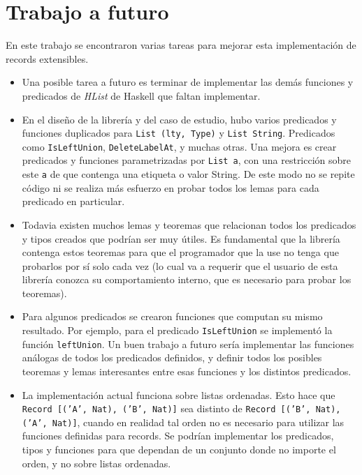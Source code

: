 
\chapter{Trabajo a futuro}
\label{ch:5}

En este trabajo se encontraron varias tareas para mejorar esta implementación de records extensibles.
\begin{itemize}
\item Una posible tarea a futuro es terminar de implementar las demás funciones y predicados de \textit{HList} de Haskell que faltan implementar.
\item En el diseño de la librería y del caso de estudio, hubo varios predicados y funciones duplicados para \texttt{List (lty, Type)} y \texttt{List String}. Predicados como \texttt{IsLeftUnion}, \texttt{DeleteLabelAt}, y muchas otras. Una mejora es crear predicados y funciones parametrizadas por \texttt{List a}, con una restricción sobre este \texttt{a} de que contenga una etiqueta o valor String. De este modo no se repite código ni se realiza más esfuerzo en probar todos los lemas para cada predicado en particular.
\item Todavia existen muchos lemas y teoremas que relacionan todos los predicados y tipos creados que podrían ser muy útiles. Es fundamental que la librería contenga estos teoremas para que el programador que la use no tenga que probarlos por sí solo cada vez (lo cual va a requerir que el usuario de esta librería conozca su comportamiento interno, que es necesario para probar los teoremas).
\item Para algunos predicados se crearon funciones que computan su mismo resultado. Por ejemplo, para el predicado \texttt{IsLeftUnion} se implementó la función \texttt{leftUnion}. Un buen trabajo a futuro sería implementar las funciones análogas de todos los predicados definidos, y definir todos los posibles teoremas y lemas interesantes entre esas funciones y los distintos predicados.
\item La implementación actual funciona sobre listas ordenadas. Esto hace que \texttt{Record [('A', Nat), ('B', Nat)]} sea distinto de \texttt{Record [('B', Nat), ('A', Nat)]}, cuando en realidad tal orden no es necesario para utilizar las funciones definidas para records. Se podrían implementar los predicados, tipos y funciones para que dependan de un conjunto donde no importe el orden, y no sobre listas ordenadas.

\end{itemize}
